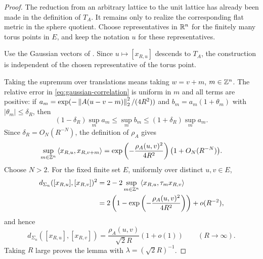\begin{proof}
The reduction from an arbitrary lattice to the unit lattice has already been
made in the definition of $T_A$.  It remains only to realize the corresponding
flat metric in the sphere quotient.  Choose representatives in $\mathbb R^n$ for the
finitely many torus points in $E$, and keep the notation $u$ for these
representatives.

Use the Gaussian vectors of .  Since
$u\mapsto[x_{R,u}]$ descends to $T_A$, the construction is independent of the
chosen representative of the torus point.

Taking the supremum over translations means taking $w=v+m$, $m\in\mathbb Z^n$.  The
relative error in \eqref{eq:gaussian-correlation} is uniform in $m$ and all
terms are positive: if
$a_m=\exp(-\left\lVert A(u-v-m)\right\rVert_2^2/(4R^2))$ and
$b_m=a_m(1+\theta_m)$ with $|\theta_m|\le\delta_R$, then
\[
        (1-\delta_R)\sup_m a_m\le \sup_m b_m\le(1+\delta_R)\sup_m a_m .
\]
Since $\delta_R=O_N(R^{-N})$, the definition of $\rho_A$ gives
\[
        \sup_{m\in\mathbb Z^n}\left\langle x_{R,u},x_{R,v+m}\right\rangle
        =\exp\left(-\frac{\rho_A(u,v)^2}{4R^2}\right)
          \bigl(1+O_N(R^{-N})\bigr).
\]
Choose $N>2$.  For the fixed finite set $E$, uniformly over distinct
$u,v\in E$,
\[
\begin{aligned}
        d_{\Sigma_n}([x_{R,u}],[x_{R,v}])^2
        &=2-2\sup_{m\in\mathbb Z^n}\left\langle x_{R,u},\tau_m x_{R,v}\right\rangle  \\
        &=2\left(1-\exp\left(-\frac{\rho_A(u,v)^2}{4R^2}\right)\right)
          +o(R^{-2}),
\end{aligned}
\]
and hence
\[
        d_{\Sigma_n}([x_{R,u}],[x_{R,v}])
        =\frac{\rho_A(u,v)}{\sqrt2 R}(1+o(1))
        \qquad (R\to\infty).
\]
Taking $R$ large proves the lemma with $\lambda=(\sqrt2 R)^{-1}$.
\end{proof}
